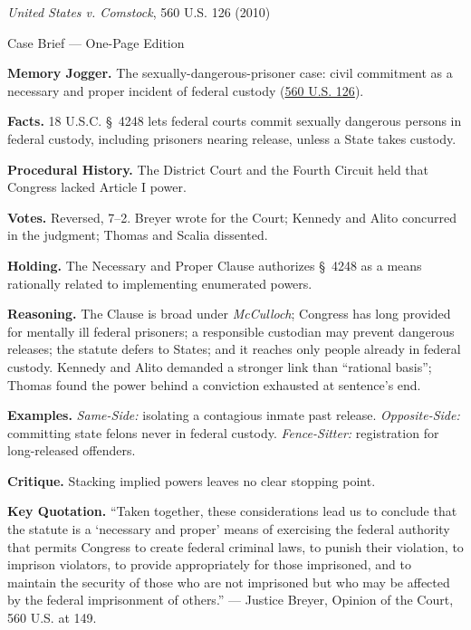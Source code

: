 \documentclass[12pt]{article}
\begin{document}
\begin{center}
{\Large \textit{United States v. Comstock}, 560 U.S. 126 (2010)\par}
\vspace{0.3em}
{\normalsize Case Brief --- One-Page Edition\par}
\end{center}

\textbf{Memory Jogger.} The sexually-dangerous-prisoner case: civil commitment as a necessary and proper incident of federal custody (\href{https://supreme.justia.com/cases/federal/us/560/126/}{560 U.S. 126}).

\textbf{Facts.} 18 U.S.C. \S~4248 lets federal courts commit sexually dangerous persons in federal custody, including prisoners nearing release, unless a State takes custody.

\textbf{Procedural History.} The District Court and the Fourth Circuit held that Congress lacked Article I power.

\textbf{Votes.} Reversed, 7--2. Breyer wrote for the Court; Kennedy and Alito concurred in the judgment; Thomas and Scalia dissented.

\textbf{Holding.} The Necessary and Proper Clause authorizes \S~4248 as a means rationally related to implementing enumerated powers.

\textbf{Reasoning.} The Clause is broad under \textit{McCulloch}; Congress has long provided for mentally ill federal prisoners; a responsible custodian may prevent dangerous releases; the statute defers to States; and it reaches only people already in federal custody. Kennedy and Alito demanded a stronger link than ``rational basis''; Thomas found the power behind a conviction exhausted at sentence's end.

\textbf{Examples.} \emph{Same-Side:} isolating a contagious inmate past release. \emph{Opposite-Side:} committing state felons never in federal custody. \emph{Fence-Sitter:} registration for long-released offenders.

\textbf{Critique.} Stacking implied powers leaves no clear stopping point.

\textbf{Key Quotation.} ``Taken together, these considerations lead us to conclude that the statute is a `necessary and proper' means of exercising the federal authority that permits Congress to create federal criminal laws, to punish their violation, to imprison violators, to provide appropriately for those imprisoned, and to maintain the security of those who are not imprisoned but who may be affected by the federal imprisonment of others.'' --- Justice Breyer, Opinion of the Court, 560 U.S. at 149.
\end{document}
